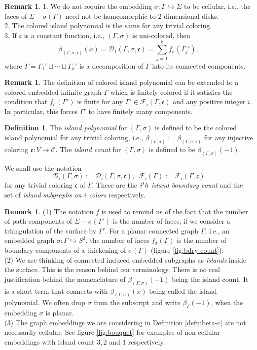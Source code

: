 \documentclass[10pt, reqno]{amsart}
\newcommand{\bgd}{\begin{displaymath}}
\newcommand{\edd}{\end{displaymath}}
\theoremstyle{plain}
\theoremstyle{remark}
\theoremstyle{definition}
\newtheorem{defn}[theorem]{Definition}
\newtheorem{rem}[theorem]{Remark}
\numberwithin{equation}{section}
\begin{document}
\begin{rem}
1. We do not require the embedding $\sigma:\Gamma\hookrightarrow \Sigma$ to be cellular, i.e., the faces of $\Sigma - \sigma(\Gamma)$ need not be homeomorphic to $2$-dimensional disks. \\
2. The colored island polynomial is the same for any trivial coloring. \\
3. If $\mathfrak{c}$ is a constant function, i.e., $(\Gamma,\sigma)$ is uni-colored, then 
\bgd
{\beta}_{(\Gamma,\sigma,\mathfrak{c})}(x)=\mathscr{D}_{1}(\Gamma,\sigma,\mathfrak{c})=\sum_{j=1}^k f_\sigma(\Gamma_j'),
\edd
where $\Gamma=\Gamma_1'\sqcup \cdots\sqcup \Gamma_k'$ is a decomposition of $\Gamma$ into its connected components.
\end{rem}
\begin{rem}\label{infinite}
The definition of colored island polynomial can be extended to a colored embedded infinite graph $\Gamma$ which is finitely colored if it satisfies the condition that $f_\sigma(\Gamma')$ is finite for any $\Gamma'\in \mathscr{F}_i(\Gamma,\mathfrak{c})$ and any positive integer $i$. In particular, this forces $\Gamma'$ to have finitely many components. 
\end{rem}
\begin{defn}\label{defn:beta}
The \textit{island polynomial} for $(\Gamma,\sigma)$ is defined to be the colored island polynomial for any trivial coloring, i.e., $\beta_{(\Gamma,\sigma)}:=\beta_{(\Gamma,\sigma,\mathfrak{c})}$ for any injective coloring $\mathfrak{c}:V\to\mathcal{C}$. The \textit{island count} for $(\Gamma,\sigma)$ is defined to be $\beta_{(\Gamma,\sigma)}(-1)$. 
\end{defn}
We shall use the notation
$$\mathscr{D}_i(\Gamma,\sigma):=\mathscr{D}_i(\Gamma,\sigma,\mathfrak{c}),\,\,\,\mathscr{F}_i(\Gamma):=\mathscr{F}_i(\Gamma,\mathfrak{c})$$
for any trivial coloring $\mathfrak{c}$ of $\Gamma$. These are the {\it $i^\textup{th}$ island boundary count} and the set of {\it island subgraphs on $i$ colors} respectively.
\begin{rem}
(1) The notation $f$ is used to remind us of the fact that the number of path components of $\Sigma- \sigma(\Gamma')$ is the number of faces, if we consider a triangulation of the surface by $\Gamma'$. For a planar connected graph $\Gamma$, i.e., an embedded graph $\sigma:\Gamma\hookrightarrow S^2$, the number of faces $f_\sigma(\Gamma)$ is the number of boundary components of a thickening of $\sigma(\Gamma)$ (figure \ref{fig:bdry-count}).  \\
(2) We are thinking of connected induced embedded subgraphs as \textit{islands} inside the surface. This is the reason behind our terminology. There is no real justification behind the nomenclature of $\beta_{(\Gamma,\sigma)}(-1)$ being the island count. It is a short term that connects with $\beta_{(\Gamma,\sigma)}(x)$ being called the island polynomial. We often drop $\sigma$ from the subscript and write $\beta_\Gamma(-1)$, when the embedding $\sigma$ is planar. \\
(3) The graph embeddings we are considering in Definition \ref{defn:beta-c} are not necessarily cellular. See figure \ref{fig:bouquet} for examples of non-cellular embeddings with island count $3,2$ and $1$ respectively.
\end{rem}
\end{document}
